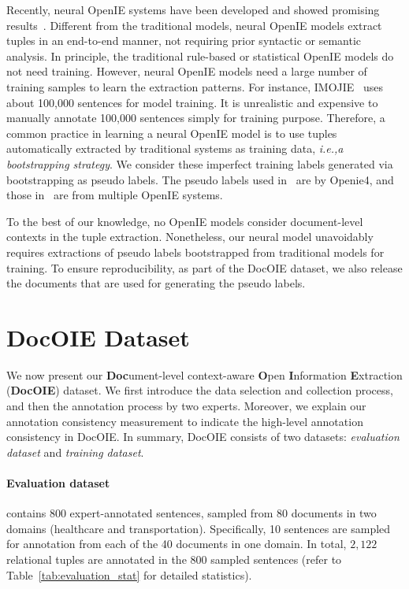 \documentclass[11pt,a4paper]{article}
\newcommand{\ie}{\emph{i.e.,}\xspace}
\newcommand{\dname}{DocOIE\xspace}
\begin{document}
Recently, neural OpenIE systems have been developed and showed promising results~\cite{cui2018neural, zhan2020span, kolluru2020openie6, kolluru2020imojie}. Different from the traditional models, neural OpenIE models extract tuples in an end-to-end manner, not requiring prior syntactic or semantic analysis. In principle, the traditional rule-based or statistical OpenIE models do not need training. However, neural OpenIE models need a large number of training samples to learn the extraction patterns. For instance, IMOJIE~\cite{kolluru2020imojie} uses about 100,000 sentences for model training. It is unrealistic and expensive to manually annotate 100,000 sentences simply for training purpose. Therefore, a common practice in learning a neural OpenIE model is to use tuples automatically extracted by traditional systems as training data, \ie \textit{a bootstrapping strategy}. We consider these imperfect training labels generated via bootstrapping as pseudo labels. The pseudo labels used in~\cite{cui2018neural} are by Openie4, and those in~\cite{kolluru2020imojie} are from multiple OpenIE systems.

To the best of our knowledge, no OpenIE models consider document-level contexts in the tuple extraction. Nonetheless, our neural model unavoidably requires extractions of pseudo labels bootstrapped from traditional models for training. To ensure reproducibility, as part of the \dname dataset, we also release the documents that are used for generating the pseudo labels.    






\section{\dname Dataset}
\label{sec:dataset}


We now present our \textbf{Doc}ument-level context-aware \textbf{O}pen \textbf{I}nformation \textbf{E}xtraction (\textbf{\dname}) dataset. 
We first introduce the data selection and collection process, and then the annotation process by two experts. Moreover, we explain our annotation consistency measurement to indicate the high-level annotation consistency in \dname. In summary, \dname consists of two datasets: \textit{evaluation dataset} and \textit{training dataset}.
\paragraph{Evaluation dataset} contains 800 expert-annotated sentences, sampled from 80 documents in two  domains (healthcare and transportation). Specifically, 10 sentences are sampled for annotation from each of the 40 documents in one domain. In total, $2,122$ relational tuples are annotated in the 800 sampled sentences (refer to Table~\ref{tab:evaluation_stat} for detailed statistics).
\end{document}
